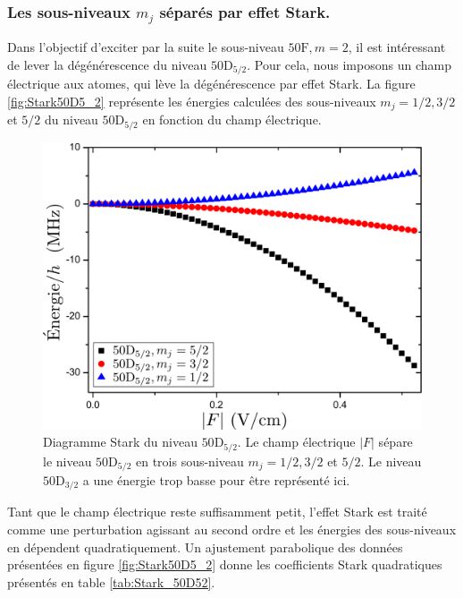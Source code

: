 		\subsubsection*{Les sous-niveaux $m_j$ séparés par effet Stark.}
\noindent Dans l'objectif d'exciter par la suite le sous-niveau $\mathrm{50F},m=2$, il est intéressant de lever la dégénérescence du niveau $\mathrm{50D}_{5/2}$.
Pour cela, nous imposons un champ électrique aux atomes, qui lève la dégénérescence par effet Stark.
La figure \eqref{fig:Stark50D5_2} représente les énergies calculées des sous-niveaux $m_j=1/2,3/2$ et $5/2$ du niveau $\mathrm{50D}_{5/2}$ en fonction du champ électrique.
%
\begin{figure}[!h]
\centering
\includegraphics[width=0.7\linewidth]{figures/circulars/Stark50D5_2}
\caption[Diagramme Stark du niveau $\mathrm{50D_{5/2}}$]{
Diagramme Stark du niveau $\mathrm{50D_{5/2}}$.
Le champ électrique $|F|$ sépare le niveau $\mathrm{50D_{5/2}}$ en trois sous-niveau $m_j=1/2,3/2$ et $5/2$.
Le niveau $\mathrm{50D_{3/2}}$ a une énergie trop basse pour être représenté ici.
}
\label{fig:Stark50D5_2}
\end{figure}
%
Tant que le champ électrique reste suffisamment petit, l'effet Stark est traité comme une perturbation agissant au second ordre et les énergies des sous-niveaux en dépendent quadratiquement.
Un ajustement parabolique des données présentées en figure \eqref{fig:Stark50D5_2} donne les coefficients Stark quadratiques présentés en table \eqref{tab:Stark_50D52}.

